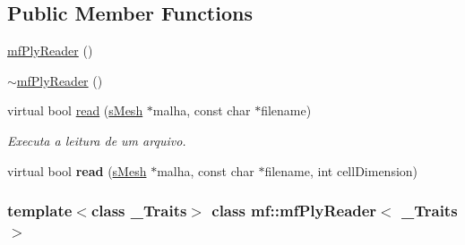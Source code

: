 \subsection*{Public Member Functions}
\begin{DoxyCompactItemize}
\item 
\hyperlink{classmf_1_1mfPlyReader_aae0df7bc479f38fbf9aaa280c73053dc}{mfPlyReader} ()
\item 
\hyperlink{classmf_1_1mfPlyReader_af076b0b7b6ad7868328f9f4482cb666d}{$\sim$mfPlyReader} ()
\item 
virtual bool \hyperlink{classmf_1_1mfPlyReader_ad4aa817979acdfdc6570d2badb288bda}{read} (\hyperlink{classmf_1_1mfPlyReader_ac1d8f2f32769b5966ac4da1d1c8ee66b}{sMesh} $\ast$malha, const char $\ast$filename)
\begin{DoxyCompactList}\small\item\em Executa a leitura de um arquivo. \item\end{DoxyCompactList}\item 
\hypertarget{classmf_1_1mfPlyReader_a924e1c0f8991f301cb54b57aebb2b8c3}{
virtual bool {\bfseries read} (\hyperlink{classmf_1_1mfPlyReader_ac1d8f2f32769b5966ac4da1d1c8ee66b}{sMesh} $\ast$malha, const char $\ast$filename, int cellDimension)}
\label{classmf_1_1mfPlyReader_a924e1c0f8991f301cb54b57aebb2b8c3}

\end{DoxyCompactItemize}
\subsubsection*{template$<$class \_\-Traits$>$ class mf::mfPlyReader$<$ \_\-Traits $>$}



